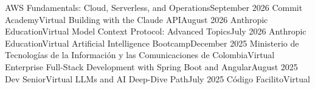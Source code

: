 \resumeSubHeadingListStart
    \resumeSubheading
        {AWS Fundamentals: Cloud, Serverless, and Operations}{September 2026}
        {Commit Academy}{Virtual}
    \resumeSubheading
        {Building with the Claude API}{August 2026}
        {Anthropic Education}{Virtual}
    \resumeSubheading
        {Model Context Protocol: Advanced Topics}{July 2026}
        {Anthropic Education}{Virtual}
    \resumeSubheading
        {Artificial Intelligence Bootcamp}{December 2025}
        {Ministerio de Tecnologías de la Información y las Comunicaciones de Colombia}{Virtual}
    \resumeSubheading
        {Enterprise Full-Stack Development with Spring Boot and Angular}{August 2025}
        {Dev Senior}{Virtual}
    \resumeSubheading
        {LLMs and AI Deep-Dive Path}{July 2025}
        {Código Facilito}{Virtual}
\resumeSubHeadingListEnd

